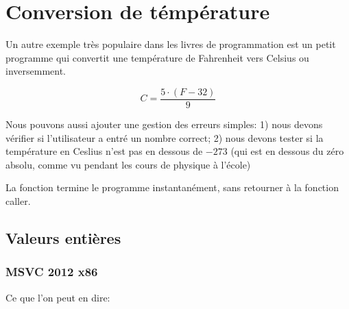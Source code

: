 \section{Conversion de témpérature}

Un autre exemple très populaire dans
les livres de programmation est un petit programme qui convertit une température de Fahrenheit vers Celsius ou inversemment.

\[
	C=\frac{5 \cdot (F-32)}{9}
\]

Nous pouvons aussi ajouter une gestion des erreurs simples:
1) nous devons vérifier si l'utilisateur a entré un nombre correct;
2) nous devons tester si la température en Ceslius n'est pas en dessous de $-273$ 
(qui est en dessous du zéro absolu, comme vu pendant les cours de physique à l'école)

La fonction  termine 
le programme instantanément, sans retourner à la fonction \gls{caller}.

\subsection{Valeurs entières}



\subsubsection{\Optimizing MSVC 2012 x86}



Ce que l'on peut en dire:

